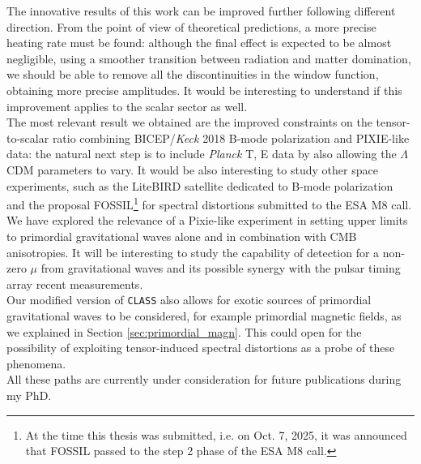 The innovative results of this work can be improved further following different direction.
From the point of view of theoretical predictions, a more precise heating rate must be found: although the final effect is expected to be almost negligible, using a smoother transition between radiation and matter domination, we should be able to remove all the discontinuities in the window function, obtaining more precise amplitudes. It would be interesting to understand if this improvement applies to the scalar sector as well. \\
The most relevant result we obtained are the improved constraints on the tensor-to-scalar ratio combining BICEP/\emph{Keck} 2018 B-mode polarization and PIXIE-like data: the natural next step is to include  \emph{Planck} T, E data by also allowing the $\Lambda$CDM parameters to vary. It would be also interesting to study other space experiments, such as the LiteBIRD \cite{LiteBIRD:2022cnt} satellite dedicated to B-mode polarization and the proposal FOSSIL\footnote{At the time this thesis was submitted, i.e. on Oct. 7, 2025, it was announced that FOSSIL passed to the step 2 phase of the ESA M8 call.} for spectral distortions submitted to the ESA M8 call.\\
We have explored the relevance of a Pixie-like experiment in setting upper limits to primordial gravitational waves alone and in combination with CMB anisotropies. It will be interesting to study the capability of detection for a non-zero $\mu$ from gravitational waves and its possible synergy with the pulsar timing array recent measurements.\\
Our modified version of \texttt{CLASS} also allows for exotic sources of primordial gravitational waves to be considered, for example primordial magnetic fields, as we explained in Section \ref{sec:primordial_magn}. This could open for the possibility of exploiting tensor-induced spectral distortions as a probe of these phenomena.\\
All these paths are currently under consideration for future publications during my PhD. 



